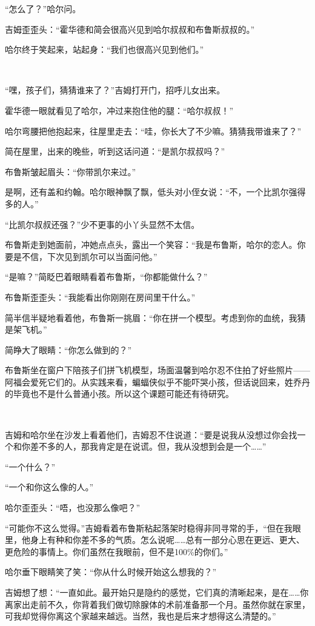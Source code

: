 \documentclass[../main]{subfiles}
\begin{document}
“怎么了？”哈尔问。

吉姆歪歪头：“霍华德和简会很高兴见到哈尔叔叔和布鲁斯叔叔的。”

哈尔终于笑起来，站起身：“我们也很高兴见到他们。”

~\

“嘿，孩子们，猜猜谁来了？”吉姆打开门，招呼儿女出来。

霍华德一眼就看见了哈尔，冲过来抱住他的腿：“哈尔叔叔！”

哈尔弯腰把他抱起来，往屋里走去：“哇，你长大了不少嘛。猜猜我带谁来了？”

简在屋里，出来的晚些，听到这话问道：“是凯尔叔叔吗？”

布鲁斯皱起眉头：“你带凯尔来过。”

是啊，还有盖和约翰。哈尔眼神飘了飘，低头对小侄女说：“不，一个比凯尔强得多的人。”

“比凯尔叔叔还强？”少不更事的小丫头显然不太信。

布鲁斯走到她面前，冲她点点头，露出一个笑容：“我是布鲁斯，哈尔的恋人。你要是不信，下次见到凯尔可以当面问他。”

“是嘛？”简眨巴着眼睛看着布鲁斯，“你都能做什么？”

布鲁斯歪歪头：“我能看出你刚刚在房间里干什么。”

简半信半疑地看着他，布鲁斯一挑眉：“你在拼一个模型。考虑到你的血统，我猜是架飞机。”

简睁大了眼睛：“你怎么做到的？”

布鲁斯坐在窗户下陪孩子们拼飞机模型，场面温馨到哈尔忍不住拍了好些照片——阿福会爱死它们的。从实践来看，蝙蝠侠似乎不能吓哭小孩，但话说回来，姓乔丹的毕竟也不是什么普通小孩。所以这个课题可能还有待研究。

~\

吉姆和哈尔坐在沙发上看着他们，吉姆忍不住说道：“要是说我从没想过你会找一个和你差不多的人，那我肯定是在说谎。但，我从没想到会是一个……”

“一个什么？”

“一个和你这么像的人。”

哈尔歪歪头：“唔，也没那么像吧？”

“可能你不这么觉得。”吉姆看着布鲁斯粘起落架时稳得非同寻常的手，“但在我眼里，他身上有种和你差不多的气质。怎么说呢……总有一部分心思在更远、更大、更危险的事情上。你们虽然在我眼前，但不是100\%的你们。”

哈尔垂下眼睛笑了笑：“你从什么时候开始这么想我的？”

吉姆想了想：“一直如此。最开始只是隐约的感觉，它们真的清晰起来，是在……你离家出走前不久，你背着我们做切除腺体的术前准备那一个月。虽然你就在家里，可我却觉得你离这个家越来越远。当然，我也是后来才想得这么清楚的。”
\end{document}
